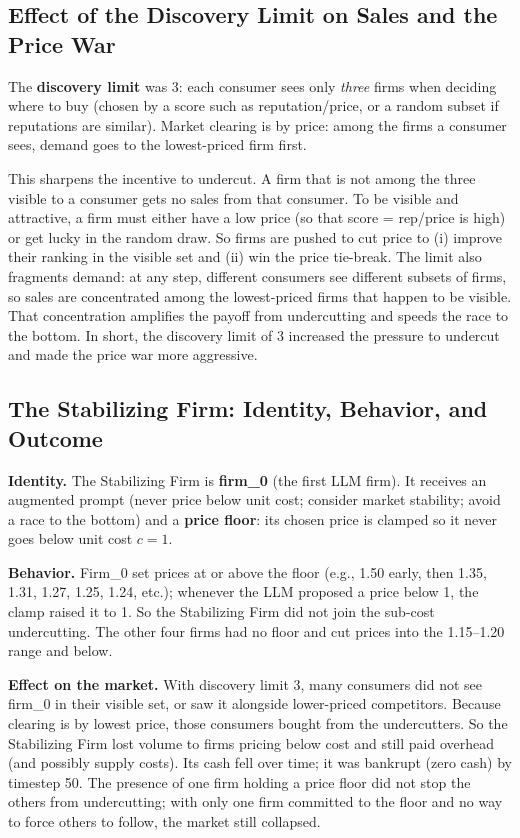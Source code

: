 \documentclass{article}
\begin{document}
\subsection{Effect of the Discovery Limit on Sales and the Price War}

The \textbf{discovery limit} was 3: each consumer sees only \emph{three} firms when deciding where to buy (chosen by a score such as reputation/price, or a random subset if reputations are similar). Market clearing is by price: among the firms a consumer sees, demand goes to the lowest-priced firm first.

This sharpens the incentive to undercut. A firm that is not among the three visible to a consumer gets no sales from that consumer. To be visible and attractive, a firm must either have a low price (so that score = rep/price is high) or get lucky in the random draw. So firms are pushed to cut price to (i) improve their ranking in the visible set and (ii) win the price tie-break. The limit also fragments demand: at any step, different consumers see different subsets of firms, so sales are concentrated among the lowest-priced firms that happen to be visible. That concentration amplifies the payoff from undercutting and speeds the race to the bottom. In short, the discovery limit of 3 increased the pressure to undercut and made the price war more aggressive.

\subsection{The Stabilizing Firm: Identity, Behavior, and Outcome}

\textbf{Identity.} The Stabilizing Firm is \textbf{firm\_0} (the first LLM firm). It receives an augmented prompt (never price below unit cost; consider market stability; avoid a race to the bottom) and a \textbf{price floor}: its chosen price is clamped so it never goes below unit cost \(c = 1\).

\textbf{Behavior.} Firm\_0 set prices at or above the floor (e.g., 1.50 early, then 1.35, 1.31, 1.27, 1.25, 1.24, etc.); whenever the LLM proposed a price below 1, the clamp raised it to 1. So the Stabilizing Firm did not join the sub-cost undercutting. The other four firms had no floor and cut prices into the 1.15--1.20 range and below.

\textbf{Effect on the market.} With discovery limit 3, many consumers did not see firm\_0 in their visible set, or saw it alongside lower-priced competitors. Because clearing is by lowest price, those consumers bought from the undercutters. So the Stabilizing Firm lost volume to firms pricing below cost and still paid overhead (and possibly supply costs). Its cash fell over time; it was bankrupt (zero cash) by timestep 50. The presence of one firm holding a price floor did not stop the others from undercutting; with only one firm committed to the floor and no way to force others to follow, the market still collapsed.
\end{document}
